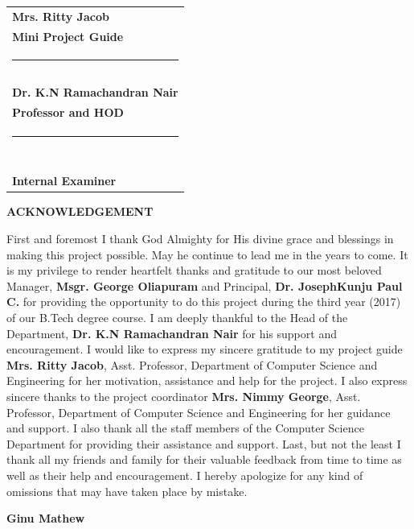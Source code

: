 \documentclass[11pt]{report}
\begin{document}
\hfill
\begin{tabular}[t]{l@{}}
\textbf{Mrs. Ritty Jacob} \\
\textbf{Mini Project Guide}\\
\rule{1cm}{0cm}\\ \\ \\
\textbf{Dr. K.N Ramachandran Nair} \\
\textbf{Professor and HOD}\\

\rule{1cm}{0cm}\\ \\ \\ \\ \\ \\
\textbf{Internal Examiner}
\end{tabular}


\newpage
\thispagestyle{empty}
\begin{center}
\Large \textbf{ACKNOWLEDGEMENT}
\vspace{1cm}
\end{center}
First and foremost I thank God Almighty for His divine grace and blessings in making this project possible. May he continue to lead me in the years to come. It is my privilege to render heartfelt thanks and gratitude to our most beloved Manager, \textbf{Msgr. George Oliapuram} and Principal, \textbf{Dr. JosephKunju Paul C.} for providing the opportunity to do this project during the third year (2017) of our B.Tech degree course. I am deeply thankful to the Head of the Department, \textbf{Dr. K.N Ramachandran Nair} for his support and encouragement. I would like to express my sincere gratitude to my project guide \newline \textbf{ Mrs. Ritty Jacob}, Asst. Professor, Department of Computer Science and Engineering for her motivation, assistance and help for the project. I also express sincere thanks to the project coordinator \textbf{Mrs. Nimmy George}, Asst. Professor, Department of Computer Science and Engineering for her guidance and support. I also thank all the staff members of the Computer Science Department for providing their assistance and support. Last, but not the least I thank all my friends and family for their valuable feedback from time to time as well as their help and encouragement. I hereby apologize for any kind of omissions that may have taken place by mistake.

\vspace{3cm}
\begin{flushright}
\textbf{Ginu Mathew}
\end{flushright}
\end{document}
